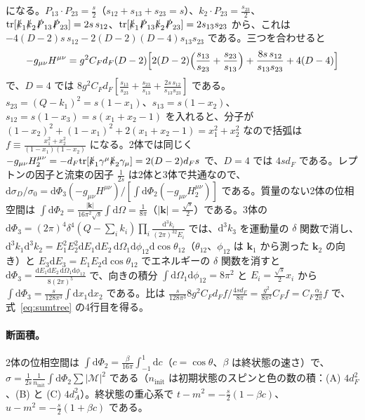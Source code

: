 \documentclass[a4paper,10pt]{ltjsarticle}
\newcommand{\dd}{\mathrm{d}}
\newcommand{\tr}{\mathrm{tr}}
\begin{document}
になる。$P_{13}\cdot P_{23}=\frac s2$（$s_{12}+s_{13}+s_{23}=s$）、$k_2\cdot P_{23}=\frac{s_{23}}2$、$\tr[\slashed k_1\slashed k_2\slashed P_{13}\slashed P_{23}]=2s\,s_{12}$、$\tr[\slashed k_1\slashed P_{13}\slashed k_2\slashed P_{23}]=2s_{13}s_{23}$ から、これは $-4(D-2)s\,s_{12}-2(D-2)(D-4)s_{13}s_{23}$ である。三つを合わせると
\begin{equation*}
-g_{\mu\nu}H^{\mu\nu}=g^2C_Fd_F(D-2)\Bigl[2(D-2)\Bigl(\frac{s_{13}}{s_{23}}+\frac{s_{23}}{s_{13}}\Bigr)+\frac{8s\,s_{12}}{s_{13}s_{23}}+4(D-4)\Bigr]
\end{equation*}
で、$D=4$ では $8g^2C_Fd_F[\frac{s_{13}}{s_{23}}+\frac{s_{23}}{s_{13}}+\frac{2s\,s_{12}}{s_{13}s_{23}}]$ である。$s_{23}=(Q-k_1)^2=s(1-x_1)$、$s_{13}=s(1-x_2)$、$s_{12}=s(1-x_3)=s(x_1+x_2-1)$ を入れると、分子が $(1-x_2)^2+(1-x_1)^2+2(x_1+x_2-1)=x_1^2+x_2^2$ なので括弧は $f\equiv\frac{x_1^2+x_2^2}{(1-x_1)(1-x_2)}$ になる。2体では同じく $-g_{\mu\nu}H_2^{\mu\nu}=-d_F\tr[\slashed k_1\gamma^\mu\slashed k_2\gamma_\mu]=2(D-2)d_Fs$ で、$D=4$ では $4sd_F$ である。レプトンの因子と流束の因子 $\frac1{2s}$ は2体と3体で共通なので、$\dd\sigma_D/\sigma_0=\dd\Phi_3(-g_{\mu\nu}H^{\mu\nu})/[\int\dd\Phi_2(-g_{\mu\nu}H_2^{\mu\nu})]$ である。質量のない2体の位相空間は $\int\dd\Phi_2=\frac{|\boldsymbol k|}{16\pi^2\sqrt s}\int\dd\Omega=\frac1{8\pi}$（$|\boldsymbol k|=\frac{\sqrt s}2$）である。3体の $\dd\Phi_3=(2\pi)^4\delta^4(Q-\sum_ik_i)\prod_i\frac{\dd^3k_i}{(2\pi)^32E_i}$ では、$\dd^3k_3$ を運動量の $\delta$ 関数で消し、$\dd^3k_1\dd^3k_2=E_1^2E_2^2\dd E_1\dd E_2\,\dd\Omega_1\dd\phi_{12}\dd\cos\theta_{12}$（$\theta_{12}$、$\phi_{12}$ は $\boldsymbol k_1$ から測った $\boldsymbol k_2$ の向き）と $E_3\dd E_3=E_1E_2\dd\cos\theta_{12}$ でエネルギーの $\delta$ 関数を消すと $\dd\Phi_3=\frac{\dd E_1\dd E_2\,\dd\Omega_1\dd\phi_{12}}{8(2\pi)^5}$ で、向きの積分 $\int\dd\Omega_1\dd\phi_{12}=8\pi^2$ と $E_i=\frac{\sqrt s}2x_i$ から $\int\dd\Phi_3=\frac{s}{128\pi^3}\int\dd x_1\dd x_2$ である。比は $\frac{s}{128\pi^3}8g^2C_Fd_Ff\big/\frac{4sd_F}{8\pi}=\frac{g^2}{8\pi^2}C_Ff=C_F\frac{\alpha_s}{2\pi}f$ で、式~\eqref{eq:sumtree} の4行目を得る。

\paragraph{断面積。}2体の位相空間は $\int\dd\Phi_2=\frac{\beta}{16\pi}\int_{-1}^1\dd c$（$c=\cos\theta$、$\beta$ は終状態の速さ）で、$\sigma=\frac{1}{2s}\frac{1}{n_{\mathrm{init}}}\int\dd\Phi_2\sum|\mathcal M|^2$ である（$n_{\mathrm{init}}$ は初期状態のスピンと色の数の積：(A) $4d_F^2$、(B) と (C) $4d_A^2$）。終状態の重心系で $t-m^2=-\frac s2(1-\beta c)$、$u-m^2=-\frac s2(1+\beta c)$ である。
\end{document}
